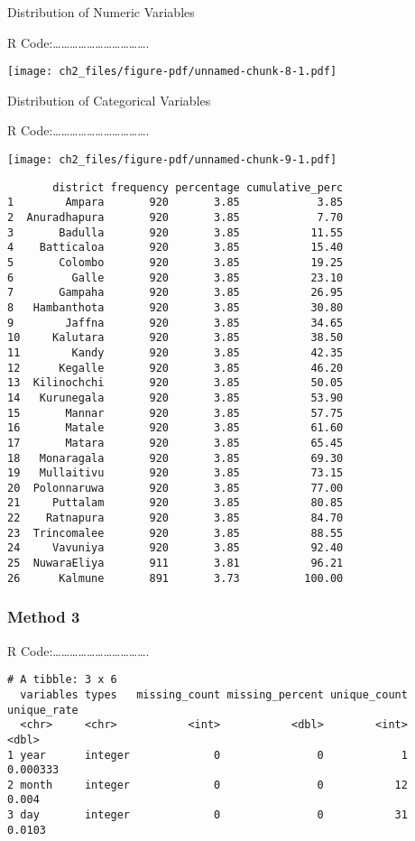 \documentclass[
  letterpaper,
  DIV=11,
  numbers=noendperiod]{scrreprt}
\begin{document}
Distribution of Numeric Variables

R
Code:\ldots\ldots\ldots\ldots\ldots\ldots\ldots\ldots\ldots\ldots\ldots.

\texttt{[image: ch2\_files/figure-pdf/unnamed-chunk-8-1.pdf]}

Distribution of Categorical Variables

R
Code:\ldots\ldots\ldots\ldots\ldots\ldots\ldots\ldots\ldots\ldots\ldots.

\texttt{[image: ch2\_files/figure-pdf/unnamed-chunk-9-1.pdf]}

\begin{verbatim}
       district frequency percentage cumulative_perc
1        Ampara       920       3.85            3.85
2  Anuradhapura       920       3.85            7.70
3       Badulla       920       3.85           11.55
4    Batticaloa       920       3.85           15.40
5       Colombo       920       3.85           19.25
6         Galle       920       3.85           23.10
7       Gampaha       920       3.85           26.95
8   Hambanthota       920       3.85           30.80
9        Jaffna       920       3.85           34.65
10     Kalutara       920       3.85           38.50
11        Kandy       920       3.85           42.35
12      Kegalle       920       3.85           46.20
13  Kilinochchi       920       3.85           50.05
14   Kurunegala       920       3.85           53.90
15       Mannar       920       3.85           57.75
16       Matale       920       3.85           61.60
17       Matara       920       3.85           65.45
18   Monaragala       920       3.85           69.30
19   Mullaitivu       920       3.85           73.15
20  Polonnaruwa       920       3.85           77.00
21     Puttalam       920       3.85           80.85
22    Ratnapura       920       3.85           84.70
23  Trincomalee       920       3.85           88.55
24     Vavuniya       920       3.85           92.40
25  NuwaraEliya       911       3.81           96.21
26      Kalmune       891       3.73          100.00
\end{verbatim}

\subsubsection{Method 3}\label{method-3}

R
Code:\ldots\ldots\ldots\ldots\ldots\ldots\ldots\ldots\ldots\ldots\ldots.

\begin{verbatim}
# A tibble: 3 x 6
  variables types   missing_count missing_percent unique_count unique_rate
  <chr>     <chr>           <int>           <dbl>        <int>       <dbl>
1 year      integer             0               0            1    0.000333
2 month     integer             0               0           12    0.004   
3 day       integer             0               0           31    0.0103  
\end{verbatim}
\end{document}
